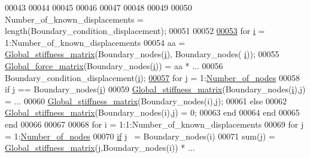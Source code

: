 \begin{DoxyCode}
00043 
00044 %
00045 
00046 %
00047 %
00048 %
00049 
00050 Number\_of\_known\_displacements = length(Boundary\_condition\_displacement);
00051 
00052 %
\hypertarget{L02_2main_8m_source_l00053}{}\hyperlink{L02_2main_8m_a6dbbc96f4222af2f6c18c8e60f41726b}{00053} \textcolor{keywordflow}{for} \hyperlink{DoS_201_2main_8m_a6dbbc96f4222af2f6c18c8e60f41726b}{i} = 1:Number\_of\_known\_displacements
00054     aa = \hyperlink{GeoTech_2BC_2main_8m_a31cdcce530a93925f9b8c6349e94e70b}{Global\_stiffness\_matrix}(Boundary\_nodes(\hyperlink{DoS_201_2main_8m_a6dbbc96f4222af2f6c18c8e60f41726b}{i}), Boundary\_nodes(
      \hyperlink{DoS_201_2main_8m_a6dbbc96f4222af2f6c18c8e60f41726b}{i}));
00055     \hyperlink{L02_2main_8m_a22c0511a90736f47a39b47581e1b823e}{Global\_force\_matrix}(Boundary\_nodes(\hyperlink{DoS_201_2main_8m_a6dbbc96f4222af2f6c18c8e60f41726b}{i})) = aa * ...
00056                 Boundary\_condition\_displacement(\hyperlink{DoS_201_2main_8m_a6dbbc96f4222af2f6c18c8e60f41726b}{i});
\hypertarget{L02_2main_8m_source_l00057}{}\hyperlink{L02_2main_8m_ac86694252f8dfdb19aaeadc4b7c342c6}{00057}     \textcolor{keywordflow}{for} \hyperlink{L01_2main_8m_abf2bc2545a4a5f5683d9ef3ed0d977e0}{j} = 1:\hyperlink{L01_2main_8m_a1d65c23ed4744bf98747671b08490b5c}{Number\_of\_nodes}
00058         \textcolor{keywordflow}{if} \hyperlink{L01_2main_8m_abf2bc2545a4a5f5683d9ef3ed0d977e0}{j} == Boundary\_nodes(\hyperlink{DoS_201_2main_8m_a6dbbc96f4222af2f6c18c8e60f41726b}{i})
00059             \hyperlink{GeoTech_2BC_2main_8m_a31cdcce530a93925f9b8c6349e94e70b}{Global\_stiffness\_matrix}(Boundary\_nodes(\hyperlink{DoS_201_2main_8m_a6dbbc96f4222af2f6c18c8e60f41726b}{i}),j) = ...
00060             \hyperlink{GeoTech_2BC_2main_8m_a31cdcce530a93925f9b8c6349e94e70b}{Global\_stiffness\_matrix}(Boundary\_nodes(i),j);
00061         else
00062             \hyperlink{GeoTech_2BC_2main_8m_a31cdcce530a93925f9b8c6349e94e70b}{Global\_stiffness\_matrix}(Boundary\_nodes(i),j) = 0;
00063         end
00064     end
00065 end
00066 
00067 %
00068 for i = 1:1:Number\_of\_known\_displacements
00069     for j = 1:\hyperlink{L01_2main_8m_a1d65c23ed4744bf98747671b08490b5c}{Number\_of\_nodes}
00070         \hyperlink{bootstrap_8min_8js_ac2d69f5011896c6ed4a54e0dd36f6334}{if} j ~= Boundary\_nodes(i)
00071             sum(j) = \hyperlink{GeoTech_2BC_2main_8m_a31cdcce530a93925f9b8c6349e94e70b}{Global\_stiffness\_matrix}(j,Boundary\_nodes(i)) * ...

\end{DoxyCode}
